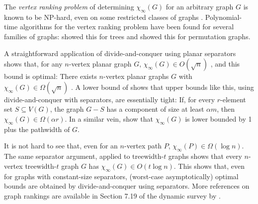 \documentclass[kpfonts]{patmorin}
\theoremstyle{named}
\begin{document}
The \emph{vertex ranking problem} of determining $\chi_\infty(G)$ for an arbitrary graph $G$ is known to be NP-hard, even on some restricted classes of graphs \cite{bodlaender.deogun.ea:rankings,llewellyn.tovey.ea:local,llewellyn.tovey.ea:erratum,dereniowski.nadolski:vertex}. Polynomial-time algorithms for the vertex ranking problem have been found for several families of graphs: \citet{schaeffer:optimal} showed this for trees and \citet{deogun.kloks.ea:on} showed this for permutation graphs.

A straightforward application of divide-and-conquer using planar separators shows that, for any $n$-vertex planar graph $G$, $\chi_\infty(G) \in O(\sqrt{n})$ \cite{llewellyn.tovey.ea:local,katchalski.mccuaig.ea:ordered}, and this bound is optimal:  There exists $n$-vertex planar graphs $G$ with $\chi_\infty(G)\in \Omega(\sqrt{n})$ \cite{katchalski.mccuaig.ea:ordered}.  A lower bound of \citet{katchalski.mccuaig.ea:ordered} shows that upper bounds like this, using divide-and-conquer with separators, are essentially tight: If, for every $r$-element set $S\subseteq V(G)$, the graph $G-S$ has a component of size at least $\alpha m$, then $\chi_\infty(G) \in\Omega(\alpha r)$. In a similar vein, \citet{bodlaender.gilbert.ea:approximating,kloks:treewidth} show that $\chi_\infty(G)$ is lower bounded by 1 plus the pathwidth of $G$.

It is not hard to see that, even for an $n$-vertex path $P$, $\chi_\infty(P)\in\Omega(\log n)$.  The same separator argument, applied to treewidth-$t$ graphs shows that every $n$-vertex treewidth-$t$ graph $G$ has $\chi_\infty(G)\in O(t\log n)$.  This shows that, even for graphs with constant-size separators, (worst-case asymptotically) optimal bounds are obtained by divide-and-conquer using separators.  More references on graph rankings are available in Section 7.19 of the dynamic survey by \citet{gallian:dynamic}.
\end{document}

